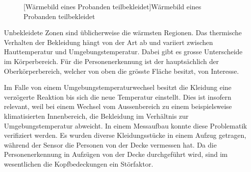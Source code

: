 \begin{figure}[!ht]
\begin{minipage}[b]{0.45\linewidth}
		[Wärmebild eines Probanden teilbekleidet]{Wärmebild eines Probanden teilbekleidet}
		\label{fig:Waermebild2}	
	\end{minipage}
\end{figure}

 Unbekleidete Zonen sind üblicherweise die wärmsten Regionen. Das thermische Verhalten der Bekleidung hängt von der Art ab und variiert zwischen Hauttemperatur und Umgebungstemperatur. Dabei gibt es grosse Unterscheide im Körperbereich. Für die Personenerkennung ist der hauptsächlich der Oberkörperbereich, welcher von oben die grösste Fläche besitzt, von Interesse.
 
 Im Falle von einem Umgebungstemperaturwechsel besitzt die Kleidung eine verzögerte Reaktion bis sich die neue Temperatur einstellt. 
 Dies ist insofern relevant, weil bei einem Wechsel vom Aussenbereich zu einem beispielsweise klimatisierten Innenbereich, die Bekleidung im Verhältnis zur Umgebungstemperatur abweicht. In einem Messaufbau konnte diese Problematik verifiziert werden. Es wurden diverse Kleidungsstücke in einem Aufzug getragen, während der Sensor die Personen von der Decke vermessen hat. Da die Personenerkennung in Aufzügen von der Decke durchgeführt wird, sind im wesentlichen die Kopfbedeckungen ein Störfaktor.

